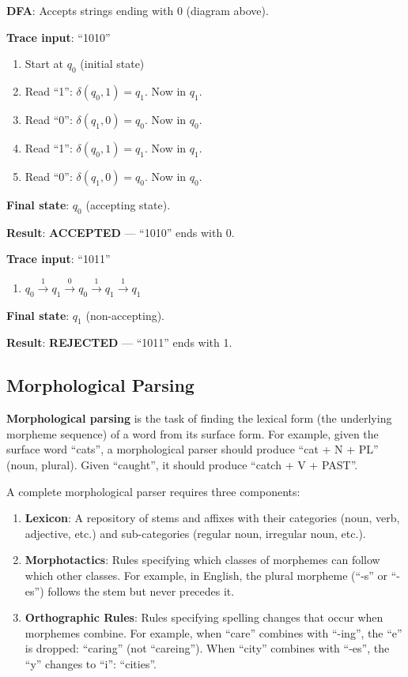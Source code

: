 \documentclass[11pt,a4paper]{article}
\begin{document}
\begin{tcolorbox}[colback=yellow!5!white,colframe=yellow!75!black,title=\textbf{Worked Example: DFA Execution Trace}]
\textbf{DFA}: Accepts strings ending with 0 (diagram above).

\textbf{Trace input}: ``1010''

\begin{enumerate}
    \item Start at $q_0$ (initial state)
    \item Read ``1'': $\delta(q_0, 1) = q_1$. Now in $q_1$.
    \item Read ``0'': $\delta(q_1, 0) = q_0$. Now in $q_0$.
    \item Read ``1'': $\delta(q_0, 1) = q_1$. Now in $q_1$.
    \item Read ``0'': $\delta(q_1, 0) = q_0$. Now in $q_0$.
\end{enumerate}

\textbf{Final state}: $q_0$ (accepting state).

\textbf{Result}: \textbf{ACCEPTED} --- ``1010'' ends with 0.

\textbf{Trace input}: ``1011''

\begin{enumerate}
    \item $q_0 \xrightarrow{1} q_1 \xrightarrow{0} q_0 \xrightarrow{1} q_1 \xrightarrow{1} q_1$
\end{enumerate}

\textbf{Final state}: $q_1$ (non-accepting).

\textbf{Result}: \textbf{REJECTED} --- ``1011'' ends with 1.
\end{tcolorbox}

\subsection{Morphological Parsing}

\textbf{Morphological parsing} is the task of finding the lexical form (the underlying morpheme sequence) of a word from its surface form. For example, given the surface word ``cats'', a morphological parser should produce ``cat + N + PL'' (noun, plural). Given ``caught'', it should produce ``catch + V + PAST''.

A complete morphological parser requires three components:
\begin{enumerate}
    \item \textbf{Lexicon}: A repository of stems and affixes with their categories (noun, verb, adjective, etc.) and sub-categories (regular noun, irregular noun, etc.).
    \item \textbf{Morphotactics}: Rules specifying which classes of morphemes can follow which other classes. For example, in English, the plural morpheme (``-s'' or ``-es'') follows the stem but never precedes it.
    \item \textbf{Orthographic Rules}: Rules specifying spelling changes that occur when morphemes combine. For example, when ``care'' combines with ``-ing'', the ``e'' is dropped: ``caring'' (not ``careing''). When ``city'' combines with ``-es'', the ``y'' changes to ``i'': ``cities''.
\end{enumerate}
\end{document}
